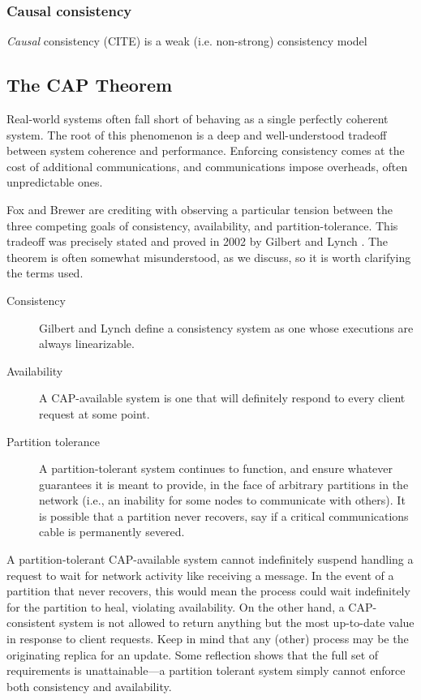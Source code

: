 \documentclass[]             %
{NASA}                       %
\theoremstyle{definition}
\begin{document}
\subsubsection{Causal consistency}
\label{causal-consistency}

\emph{Causal} consistency (CITE) is a weak (i.e. non-strong)
consistency model


\subsection{The CAP Theorem}
\label{the-cap-theorem}

Real-world systems often fall short of behaving as a single perfectly
coherent system. The root of this phenomenon is a deep and
well-understood tradeoff between system coherence and performance.
Enforcing consistency comes at the cost of additional communications,
and communications impose overheads, often unpredictable ones.

Fox and Brewer \cite{1999foxbrewer} are crediting with observing a
particular tension between the three competing goals of consistency,
availability, and partition-tolerance. This tradeoff was precisely
stated and proved in 2002 by Gilbert and Lynch
\cite{2002gilbertlynchCAP}.  The theorem is often somewhat
misunderstood, as we discuss, so it is worth clarifying the terms
used.

\begin{description}
  \item[Consistency] Gilbert and Lynch define a consistency system as one whose executions
are always linearizable.
\item[Availability] A CAP-available system is one that will definitely respond to every
client request at some point.
\item[Partition tolerance]
A partition-tolerant system continues to function, and ensure whatever
guarantees it is meant to provide, in the face of arbitrary partitions
in the network (i.e., an inability for some nodes to communicate with
others). It is possible that a partition never recovers, say if a
critical communications cable is permanently severed.
\end{description}

A partition-tolerant CAP-available system cannot indefinitely suspend
handling a request to wait for network activity like receiving a
message. In the event of a partition that never recovers, this would
mean the process could wait indefinitely for the partition to heal,
violating availability. On the other hand, a CAP-consistent system is
not allowed to return anything but the most up-to-date value in
response to client requests. Keep in mind that any (other) process may
be the originating replica for an update. Some reflection shows that
the full set of requirements is unattainable---a partition tolerant
system simply cannot enforce both consistency and availability.
\end{document}
